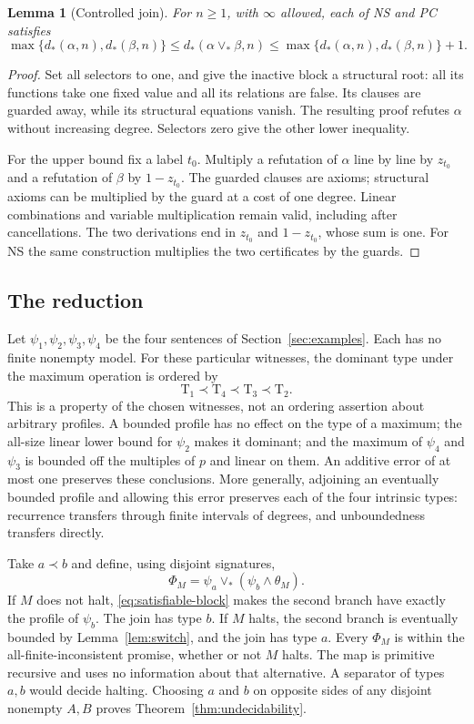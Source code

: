 \documentclass[11pt,a4paper]{article}
\newtheorem{lemma}[theorem]{Lemma}
\theoremstyle{definition}\newtheorem{definition}[theorem]{Definition}
\theoremstyle{remark}\newtheorem{remark}[theorem]{Remark}
\newcommand{\join}{\mathbin{\vee_*}}
\begin{document}
\begin{lemma}[Controlled join]\label{lem:join}
For $n\ge1$, with $\infty$ allowed, each of NS and PC satisfies
\[
 \max\{d_*(\alpha,n),d_*(\beta,n)\}
 \le d_*(\alpha\join\beta,n)
 \le\max\{d_*(\alpha,n),d_*(\beta,n)\}+1.
\]
\end{lemma}
\begin{proof}
Set all selectors to one, and give the inactive block a structural root:
all its functions take one fixed value and all its relations are false.
Its clauses are guarded away, while its structural equations vanish.
The resulting proof refutes $\alpha$ without increasing degree. Selectors
zero give the other lower inequality.

For the upper bound fix a label $t_0$. Multiply a refutation of $\alpha$
line by line by $z_{t_0}$ and a refutation of $\beta$ by $1-z_{t_0}$.
The guarded clauses are axioms; structural axioms can be multiplied by
the guard at a cost of one degree. Linear combinations and variable
multiplication remain valid, including after cancellations. The two
derivations end in $z_{t_0}$ and $1-z_{t_0}$, whose sum is one. For NS
the same construction multiplies the two certificates by the guards.
\end{proof}

\subsection{The reduction}
Let $\psi_1,\psi_2,\psi_3,\psi_4$ be the four sentences of
Section~\ref{sec:examples}. Each has no finite nonempty model. For these particular
witnesses, the dominant type under the maximum operation is ordered by
\[
                 \mathrm T_1\prec\mathrm T_4\prec\mathrm T_3\prec\mathrm T_2.
\]
This is a property of the chosen witnesses, not an ordering assertion about
arbitrary profiles. A bounded profile has no effect on the type of a maximum;
the all-size linear lower bound for $\psi_2$ makes it dominant; and the
maximum of $\psi_4$ and $\psi_3$ is bounded off the multiples of $p$ and
linear on them. An additive error of at most one preserves these conclusions.
More generally, adjoining an eventually bounded profile and allowing this
error preserves each of the four intrinsic types: recurrence transfers
through finite intervals of degrees, and unboundedness transfers directly.

Take $a\prec b$ and define, using disjoint signatures,
\[
             \Phi_M=\psi_a\join(\psi_b\wedge\theta_M).
\]
If $M$ does not halt, \eqref{eq:satisfiable-block} makes the second branch
have exactly the profile of $\psi_b$. The join has type $b$. If $M$ halts,
the second branch is eventually bounded by Lemma~\ref{lem:switch}, and the
join has type $a$. Every $\Phi_M$ is within the all-finite-inconsistent
promise, whether or not $M$ halts. The map is primitive recursive and
uses no information about that alternative. A separator of types $a,b$
would decide halting. Choosing $a$ and $b$ on opposite sides of any
disjoint nonempty $A,B$ proves Theorem~\ref{thm:undecidability}.
\end{document}
